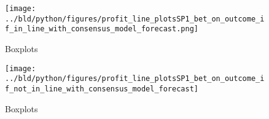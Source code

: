 \documentclass[11pt, a4paper, leqno]{article}
\begin{document}
\begin{figure}[H]
    \centering
    \texttt{[image: ../bld/python/figures/profit\_line\_plotsSP1\_bet\_on\_outcome\_if\_in\_line\_with\_consensus\_model\_forecast.png]}
    \caption{Boxplots}
    \label{fig:figure2}
\end{figure}
\begin{figure}[H]
    \centering
    \texttt{[image: ../bld/python/figures/profit\_line\_plotsSP1\_bet\_on\_outcome\_if\_not\_in\_line\_with\_consensus\_model\_forecast]}
    \caption{Boxplots}
    \label{fig:figure2}
\end{figure}











\end{document}
